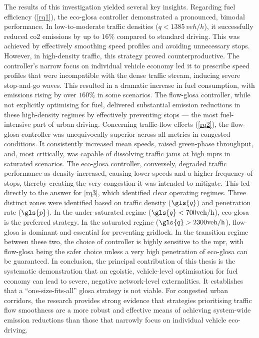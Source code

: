 \mynewline
The results of this investigation yielded several key insights. Regarding fuel efficiency (\vref{rq1}), the \ac{eco-glosa} controller demonstrated a pronounced, bimodal performance. In low-to-moderate traffic densities ($q < 1385\,\unit{veh/h}$), it successfully reduced \ac{co2} emissions by up to $16\%$ compared to standard driving. This was achieved by effectively smoothing speed profiles and avoiding unnecessary stops. However, in high-density traffic, this strategy proved counterproductive. The controller's narrow focus on individual vehicle economy led it to prescribe speed profiles that were incompatible with the dense traffic stream, inducing severe stop-and-go waves. This resulted in a dramatic increase in fuel consumption, with emissions rising by over $160\%$ in some scenarios. The \ac{flow-glosa} controller, while not explicitly optimising for fuel, delivered substantial emission reductions in these high-density regimes by effectively preventing stops --- the most fuel-intensive part of urban driving.
\mynewline
Concerning traffic-flow effects (\vref{rq2}), the \ac{flow-glosa} controller was unequivocally superior across all metrics in congested conditions. It consistently increased mean speeds, raised green-phase throughput, and, most critically, was capable of dissolving traffic jams at high \acp{mpr} in saturated scenarios. The \ac{eco-glosa} controller, conversely, degraded traffic performance as density increased, causing lower speeds and a higher frequency of stops, thereby creating the very congestion it was intended to mitigate.
\mynewline
This led directly to the answer for \vref{rq3}, which identified clear operating regimes. Three distinct zones were identified based on traffic density ($\gls{q}$) and penetration rate ($\gls{p}$). In the under-saturated regime ($\gls{q} < 700\unit{veh/h}$), \ac{eco-glosa} is the preferred strategy. In the saturated regime ($\gls{q} > 2300\unit{veh/h}$), \ac{flow-glosa} is dominant and essential for preventing gridlock. In the transition regime between these two, the choice of controller is highly sensitive to the \ac{mpr}, with \ac{flow-glosa} being the safer choice unless a very high penetration of \ac{eco-glosa} can be guaranteed.
\mynewline
In conclusion, the principal contribution of this thesis is the systematic demonstration that an egoistic, vehicle-level optimisation for fuel economy can lead to severe, negative network-level externalities. It establishes that a \enquote{one-size-fits-all} \ac{glosa} strategy is not viable. For congested urban corridors, the research provides strong evidence that strategies prioritising traffic flow smoothness are a more robust and effective means of achieving system-wide emission reductions than those that narrowly focus on individual vehicle eco-driving.

